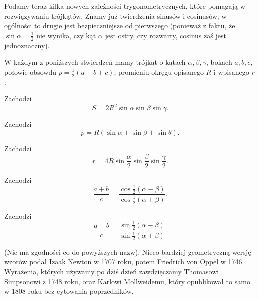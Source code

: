 
Podamy teraz kilka nowych zależności trygonometrycznych, które pomagają w rozwiązywaniu trójkątów.
Znamy już twierdzenia sinusów i cosinusów; w ogólności to drugie jest bezpieczniejsze od pierwszego (ponieważ z faktu, że $\sin \alpha = \frac 1 2$ nie wynika, czy kąt $\alpha$ jest ostry, czy rozwarty, cosinus zaś jest jednoznaczny).

W każdym z poniższych stwierdzeń mamy trójkąt o kątach $\alpha, \beta, \gamma$, bokach $a, b, c$, połowie obsowdu $p = \frac 1 2 (a + b + c)$, promieniu okręgu opisanego $R$ i wpisanego $r$.

\begin{proposition}
    Zachodzi
    \begin{equation}
    S = 2 R^2 \sin \alpha \sin \beta \sin \gamma.
    \end{equation}
\end{proposition}

\begin{proposition}
    Zachodzi
    \begin{equation}
        p = R (\sin \alpha + \sin \beta + \sin \theta).
    \end{equation}
\end{proposition}

\begin{proposition}
    Zachodzi
    \begin{equation}
        r = 4R \sin \frac \alpha 2 \sin \frac \beta 2 \sin \frac \gamma 2.
    \end{equation}
\end{proposition}

\begin{proposition}
%
    Zachodzi
    \begin{equation}
        \frac{a + b}{c} = \frac{\cos \frac 1 2 (\alpha - \beta)}{\cos \frac 1 2 (\alpha + \beta)}.
    \end{equation}
\end{proposition}

\begin{proposition}
%
    Zachodzi
    \begin{equation}
        \frac{a - b}{c} = \frac{\sin \frac 1 2 (\alpha - \beta)}{\sin \frac 1 2 (\alpha + \beta)}.
    \end{equation}
\end{proposition}

(Nie ma zgodności co do powyższych nazw).
Nieco bardziej geometryczną wersję wzorów podał Izaak Newton w 1707 roku, potem Friedrich von Oppel w 1746.
%
%
Wyrażenia, których używamy po dziś dzień zawdzięczamy Thomasowi Simpsonowi z 1748 roku, oraz Karlowi Mollweidemu, który opublikował to samo w 1808 roku bez cytowania poprzedników.
%
%

